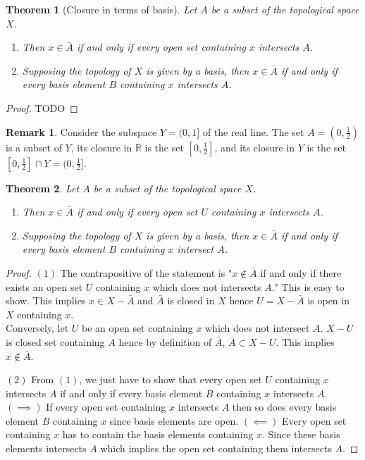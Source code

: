 \documentclass[12pt,reqno]{amsart}
\theoremstyle{plain}
\newtheorem{thm}{Theorem}
\theoremstyle{definition}
\newtheorem{rem}{Remark}
\begin{document}
\begin{thm}[Closure in terms of basis]
    Let $A$ be a subset of the topological space $X$.
    \begin{enumerate}
        \item Then $x \in \bar{A}$ if and only if every open set containing $x$ intersects $A$.
        \item Supposing the topology of $X$ is given by a basis, then $x \in \bar{A}$ if and only if every basis element $B$ containing $x$ intersects $A$.
    \end{enumerate}
\end{thm}
\begin{proof}
    TODO
\end{proof}
\begin{rem}
    Consider the subspace $Y = (0,1]$ of the real line. The set $A = (0, \frac{1}{2})$ is a subset of $Y$, its closure in $\mathbb{R}$ is the set $[0, \frac{1}{2}]$, and its closure in $Y$ is the set $[0,\frac{1}{2}] \cap Y = (0,\frac{1}{2}]$.
\end{rem}

\begin{thm}
    Let $A$ be a subset of the topological space $X$.
    \begin{enumerate}
        \item Then $x \in \bar{A}$ if and only if every open set $U$ containing $x$ intersects $A$.
        \item Supposing the topology of $X$ is given by a basis, then $x \in \bar{A}$ if and only if every basis element $B$ containing $x$ intersect $A$.
    \end{enumerate}
\end{thm}
\begin{proof}
    $(1)$ The contrapositive of the statement is "$x \notin \bar{A}$ if and only if there exists an open set $U$ containing $x$ which does not intersects $A$." This is easy to show. This implies $x \in X - \bar{A}$ and $\bar{A}$ is closed in $X$ hence $U = X - \bar{A}$ is open in $X$ containing $x$.\\
    Conversely, let $U$ be an open set containing $x$ which does not intersect $A$. $X - U$ is closed set containing $A$ hence by definition of $\bar{A}$, $\bar{A} \subset X - U$. This implies $x \notin \bar{A}$.

    $(2)$ From $(1)$, we just have to show that every open set $U$ containing $x$ intersects $A$ if and only if every basis element $B$ containing $x$ intersects $A$. $(\implies)$ If every open set containing $x$ intersects $A$ then so does every basis element $B$ containing $x$ since basis elements are open. $(\impliedby)$ Every open set containing $x$ has to contain the basis elements containing $x$. Since these basis elements intersects $A$ which implies the open set containing them intersects $A$.
\end{proof}
\end{document}
